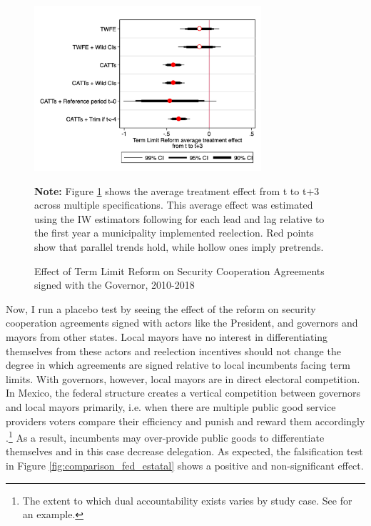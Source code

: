 \documentclass[12pt]{amsart}
\numberwithin{equation}{section}
\theoremstyle{definition}
\theoremstyle{definition}
\theoremstyle{definition}
\begin{document}
  
\begin{figure}[h]   
\centering
 \caption{Effect of Term Limit Reform on Security Cooperation Agreements signed with the Governor, 2010-2018}
 \label{fig:robustness_agreements}
\includegraphics[width=0.75\textwidth]{Figures/average_effects.png}
       \captionsetup{justification=centering}
       
 \textbf{Note:} Figure \ref{fig:robustness_agreements} shows the average treatment effect from t to t+3 across multiple specifications. This average effect was estimated using the IW estimators following \citet{abraham_sun_2020} for each lead and lag relative to the first year a municipality implemented reelection. Red points show that parallel trends hold, while hollow ones imply pretrends. 
\end{figure}   

Now, I run a placebo test by seeing the effect of the reform on security cooperation agreements signed with actors like the President, and governors and mayors from other states. Local mayors have no interest in differentiating themselves from these actors and reelection incentives should not change the degree in which agreements are signed relative to local incumbents facing term limits. With governors, however, local mayors are in direct electoral competition. In Mexico, the federal structure creates a vertical competition between governors and local mayors primarily, i.e. when there are multiple public good service providers voters compare their efficiency and punish and reward them accordingly \citep{treisman_2000}.\footnote{The extent to which dual accountability exists varies by study case. See \citet{rodden_2010} for an example.} As a result, incumbents may over-provide public goods to differentiate themselves \citep{salmon_1987, Breton_1996, treisman_2000} and in this case decrease delegation. As expected,  the falsification test in Figure \ref{fig:comparison_fed_estatal} shows a positive and non-significant effect. 
    
\end{document}

